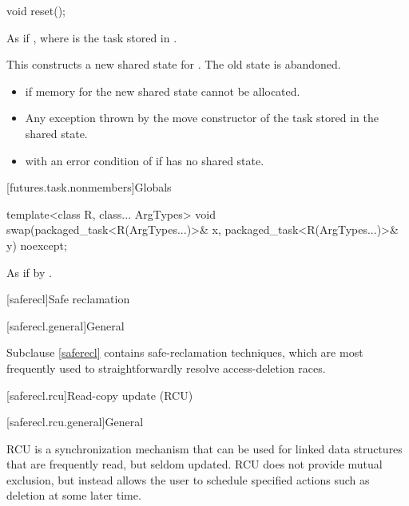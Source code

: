 %
\begin{itemdecl}
void reset();
\end{itemdecl}

\begin{itemdescr}
\pnum
\effects
As if , where
 is the task stored in
.
\begin{note}
This constructs a new shared state for . The
old state is abandoned.
\end{note}

\pnum
\throws
\begin{itemize}
\item {} if memory for the new shared state cannot be allocated.
\item Any exception thrown by the move constructor of the task stored in the shared
state.
\item {} with an error condition of  if 
has no shared state.
\end{itemize}
\end{itemdescr}

[futures.task.nonmembers]{Globals}

%
\begin{itemdecl}
template<class R, class... ArgTypes>
  void swap(packaged_task<R(ArgTypes...)>& x, packaged_task<R(ArgTypes...)>& y) noexcept;
\end{itemdecl}

\begin{itemdescr}
\pnum
\effects
As if by .
\end{itemdescr}

[saferecl]{Safe reclamation}

[saferecl.general]{General}

\pnum
Subclause \ref{saferecl} contains safe-reclamation techniques, which are most
frequently used to straightforwardly resolve access-deletion races.

[saferecl.rcu]{Read-copy update (RCU)}

[saferecl.rcu.general]{General}

\pnum
RCU is a synchronization mechanism
that can be used for linked data structures
that are frequently read, but seldom updated.
RCU does not provide mutual exclusion,
but instead allows the user to schedule specified actions
such as deletion at some later time.

